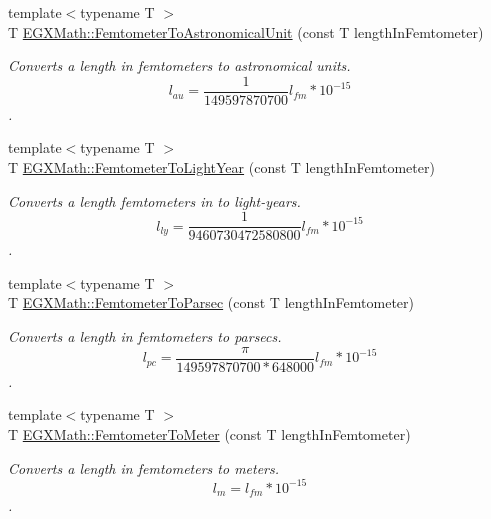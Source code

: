\begin{DoxyCompactItemize}
\item 
{\footnotesize template$<$typename T $>$ }\\T \mbox{\hyperlink{group___e_g_x_math-_conversions-_length_conversions-_s_i-_femtometer-_astronomical_ga9c379bc2a0ed6ff83f0d545bab48e909}{E\+G\+X\+Math\+::\+Femtometer\+To\+Astronomical\+Unit}} (const T length\+In\+Femtometer)
\begin{DoxyCompactList}\small\item\em Converts a length in femtometers to astronomical units. \[ l_{au}= \frac{1}{149597870700} l_{fm} * 10^{-15} \]. \end{DoxyCompactList}\item 
{\footnotesize template$<$typename T $>$ }\\T \mbox{\hyperlink{group___e_g_x_math-_conversions-_length_conversions-_s_i-_femtometer-_astronomical_gaae002ed0894f79e0fa6889732d52e01d}{E\+G\+X\+Math\+::\+Femtometer\+To\+Light\+Year}} (const T length\+In\+Femtometer)
\begin{DoxyCompactList}\small\item\em Converts a length femtometers in to light-\/years. \[ l_{ly}= \frac{1}{9460730472580800} l_{fm} * 10^{-15} \]. \end{DoxyCompactList}\item 
{\footnotesize template$<$typename T $>$ }\\T \mbox{\hyperlink{group___e_g_x_math-_conversions-_length_conversions-_s_i-_femtometer-_astronomical_ga40144bb4cb7d474b9a22394a0f321faa}{E\+G\+X\+Math\+::\+Femtometer\+To\+Parsec}} (const T length\+In\+Femtometer)
\begin{DoxyCompactList}\small\item\em Converts a length in femtometers to parsecs. \[ l_{pc}=\frac{\pi}{149597870700 * 648000} l_{fm} * 10^{-15} \]. \end{DoxyCompactList}\item 
{\footnotesize template$<$typename T $>$ }\\T \mbox{\hyperlink{group___e_g_x_math-_conversions-_length_conversions-_s_i-_femtometer-_s_i_gad0ac4ef551ee703c8952fe04fbd90f78}{E\+G\+X\+Math\+::\+Femtometer\+To\+Meter}} (const T length\+In\+Femtometer)
\begin{DoxyCompactList}\small\item\em Converts a length in femtometers to meters. \[ l_{m}=l_{fm} * 10^{-15} \]. \end{DoxyCompactList}\item 

\end{DoxyCompactItemize}
